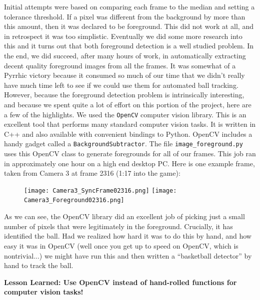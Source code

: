 \documentclass{article}
\begin{document}
Initial attempts were based on comparing each frame to the median and setting a tolerance threshold.
If a pixel was different from the background by more than this amount, then it was declared to be foreground.
This did not work at all, and in retrospect it was too simplistic.
Eventually we did some more research into this and it turns out that both foreground detection
is a well studied problem.  In the end, we did succeed, after many hours of work, in automatically 
extracting decent quality foreground images from all the frames.  
It was somewhat of a Pyrrhic victory because it consumed so much of our time that we didn't
really have much time left to see if we could use them for automated ball tracking.
However, because the foreground detection problem is intrinsically interesting,
and because we spent quite a lot of effort on this portion of the project, here are a few of the highlights.
We used the \texttt{OpenCV} computer vision library.  
This is an excellent tool that performs many standard computer vision tasks.  
It is written in C++ and also available with convenient bindings to Python.
OpenCV includes a handy gadget called a \texttt{BackgroundSubtractor}.
The file \texttt{image\_foreground.py} uses this OpenCV class to generate foregrounds
for all of our frames.  This job ran in approximately one hour on a high end desktop PC.
Here is one example frame, taken from Camera 3 at frame 2316 (1:17 into the game):
\begin{figure}[H]
\center
\texttt{[image: Camera3\_SyncFrame02316.png]}
\texttt{[image: Camera3\_Foreground02316.png]}
\end{figure}

As we can see, the OpenCV library did an excellent job of picking just a small number 
of pixels that were legitimately in the foreground.  Crucially, it has identified the ball.
Had we realized how hard it was to do this by hand, and how easy it was in OpenCV
(well once you get up to speed on OpenCV, which is nontrivial...)
we might have run this and then written a ``basketball detector'' by hand to track the ball.

\textbf{Lesson Learned: Use OpenCV instead of hand-rolled functions for computer vision tasks!}

\newpage
\end{document}
